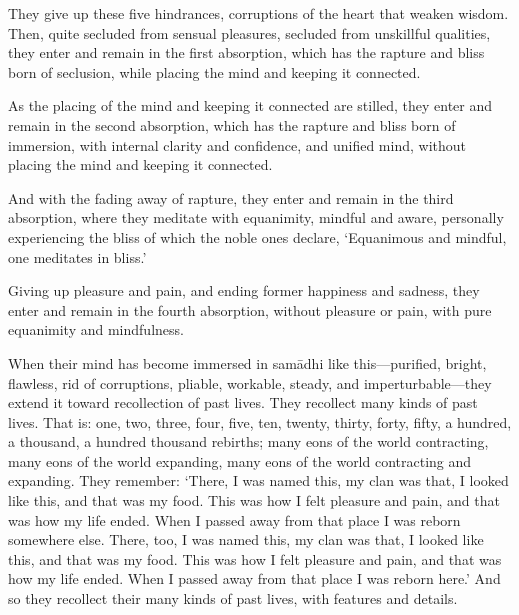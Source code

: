 \documentclass[12pt,openany]{book}%
\begin{document}
They give up these five hindrances, corruptions of the heart that weaken wisdom. Then, quite secluded from sensual pleasures, secluded from unskillful qualities, they enter and remain in the first absorption, which has the rapture and bliss born of seclusion, while placing the mind and keeping it connected. 

As the placing of the mind and keeping it connected are stilled, they enter and remain in the second absorption, which has the rapture and bliss born of immersion, with internal clarity and confidence, and unified mind, without placing the mind and keeping it connected. 

And with the fading away of rapture, they enter and remain in the third absorption, where they meditate with equanimity, mindful and aware, personally experiencing the bliss of which the noble ones declare, ‘Equanimous and mindful, one meditates in bliss.’ 

Giving up pleasure and pain, and ending former happiness and sadness, they enter and remain in the fourth absorption, without pleasure or pain, with pure equanimity and mindfulness. 

When their mind has become immersed in \textsanskrit{samādhi} like this—purified, bright, flawless, rid of corruptions, pliable, workable, steady, and imperturbable—they extend it toward recollection of past lives. They recollect many kinds of past lives. That is: one, two, three, four, five, ten, twenty, thirty, forty, fifty, a hundred, a thousand, a hundred thousand rebirths; many eons of the world contracting, many eons of the world expanding, many eons of the world contracting and expanding. They remember: ‘There, I was named this, my clan was that, I looked like this, and that was my food. This was how I felt pleasure and pain, and that was how my life ended. When I passed away from that place I was reborn somewhere else. There, too, I was named this, my clan was that, I looked like this, and that was my food. This was how I felt pleasure and pain, and that was how my life ended. When I passed away from that place I was reborn here.’ And so they recollect their many kinds of past lives, with features and details. 
\end{document}
